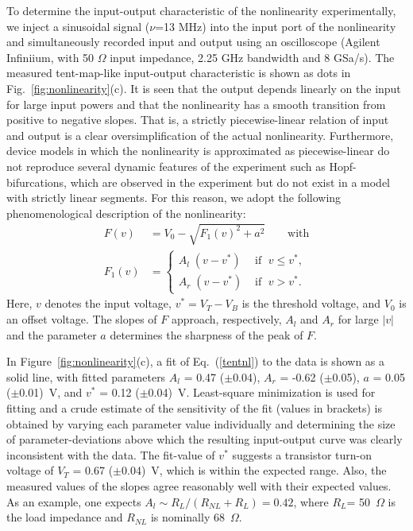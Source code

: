 \documentclass[aps,twocolumn,pre,nofootinbib]{revtex4}
\begin{document}
 
To determine  the input-output characteristic of the nonlinearity experimentally, we inject a sinusoidal signal ($\nu$=13 MHz) into the input port of the nonlinearity and simultaneously recorded input and output using an oscilloscope (Agilent Infiniium, with 50 $\Omega$ input impedance, 2.25 GHz bandwidth and 8 GSa/s).
The measured tent-map-like input-output characteristic is shown as dots in Fig.~\ref{fig:nonlinearity}(c). 
It is seen that the output depends linearly on the input for large input powers and that the nonlinearity has a smooth transition from positive to negative slopes. That is, a strictly piecewise-linear relation of input and output is a clear oversimplification of the actual nonlinearity. 
Furthermore, device models in which the nonlinearity is approximated as piecewise-linear do not reproduce several dynamic features of the experiment such as Hopf-bifurcations, which are observed in the experiment but do not exist in a model with strictly linear segments. 
For this reason, we adopt the following phenomenological description of the nonlinearity: 
%
\begin{equation}
\begin{split}
F(v) &= V_0 - \sqrt{ F_1(v)^2 + a^2} \qquad \text{with} \\
F_1(v) &= 
\begin{cases}
A_l \; (v - v^*) &  \text{  if }\; v \le v^* ,\\
A_r \; (v - v^*) & \text{  if  }\; v > v^* .
\end{cases}
\end{split}
\label{tentnl}
\end{equation}
%
Here, $v$ denotes the input voltage, $v^*=V_T-V_B$ is the threshold voltage, and $V_0$ is an offset voltage. The slopes of $F$ approach, respectively, $A_l$ and $A_r$ for large $|v|$ and the parameter $a$ determines the sharpness of the peak of $F$.

In Figure~\ref{fig:nonlinearity}(c), a fit of Eq.~(\ref{tentnl}) to the data is shown as a solid line, with fitted parameters $A_l$ = 0.47 ($\pm$0.04), $A_r$ = -0.62 ($\pm$0.05), $a$ = 0.05 ($\pm$0.01)~V, and $v^*$ = 0.12 ($\pm$0.04)~V. Least-square minimization is used for fitting and a crude estimate of the sensitivity of the fit (values in brackets) is obtained by varying each parameter value individually and determining the size of parameter-deviations above which the resulting input-output curve was clearly inconsistent with the data. 
The fit-value of $v^*$ suggests a transistor  turn-on voltage of $V_T$ = 0.67 ($\pm$0.04)~V, which is within the expected range.
Also, the measured values of the slopes agree reasonably well with their expected values. As an example, one expects $A_l \sim R_L/(R_{NL} + R_L) = 0.42$, where $R_L$= 50~$\Omega$ is the load impedance and $R_{NL}$ is nominally 68~$\Omega$.
\end{document}
